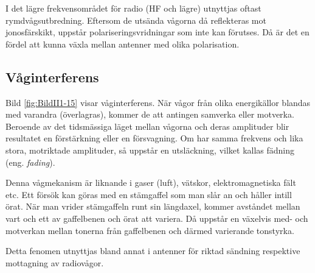 I det lägre frekvensområdet för radio (HF och lägre) utnyttjas oftast
rymdvågsutbredning.
Eftersom de utsända vågorna då reflekteras mot jonosfärskikt, uppstår
polariseringsvridningar som inte kan förutses.
Då är det en fördel att kunna växla mellan antenner med olika polarisation.

\subsection{Våginterferens}

Bild \ref{fig:BildII1-15} visar våginterferens.
När vågor från olika energikällor blandas med varandra (överlagras), kommer
de att antingen samverka eller motverka.
Beroende av det tidsmässiga läget mellan vågorna och deras amplituder blir
resultatet en förstärkning eller en försvagning.
Om har samma frekvens och lika stora, motriktade amplituder, så uppstår en
utsläckning, vilket kallas fädning (eng. \emph{fading}).

Denna vågmekanism är liknande i gaser (luft), vätskor, elektromagnetiska fält
etc.
Ett försök kan göras med en stämgaffel som man slår an och håller intill örat.
När man vrider stämgaffeln runt sin längdaxel, kommer avståndet mellan
vart och ett av gaffelbenen och örat att variera.
Då uppstår en växelvis med- och motverkan mellan tonerna från gaffelbenen och
därmed varierande tonstyrka.

Detta fenomen utnyttjas bland annat i antenner för riktad sändning respektive
mottagning av radiovågor.

